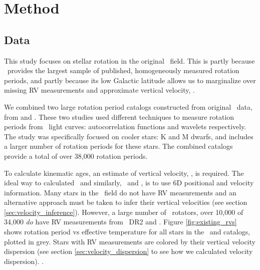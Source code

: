 \section{Method}
\label{sec:method}

\subsection{Data}
\label{sec:data}

This study focuses on stellar rotation in the original \kepler\ field.
This is partly because \kepler\ provides the largest sample of published,
homogeneously measured rotation periods, and partly because its low Galactic
latitude allows us to marginalize over missing RV measurements and approximate
vertical velocity, \vz.

We combined two large rotation period catalogs constructed from original
\kepler\ data, from \citet{mcquillan2014} and \citet{santos2019}.
These two studies used different techniques to measure rotation periods from
\kepler\ light curves: autocorrelation functions and wavelets respectively.
The \citet{santos2019} study was specifically focused on cooler stars: K and M
dwarfs, and includes a larger number of rotation periods for these stars.
The combined catalogs provide a total of over 38,000 rotation periods.

To calculate kinematic ages, an estimate of vertical velocity, \vz, is
required.
The ideal way to calculated \vz\, and similarly, \vx\ and \vy, is to use 6D
positional and velocity information.
Many stars in the \kepler\ field do not have RV measurements and an
alternative approach must be taken to infer their vertical velocities (see
section \ref{sec:velocity_inference}).
However, a large number of \kepler\ rotators, over 10,000 of 34,000 {\it do}
have RV measurements from \gaia\ DR2 and \lamost.
Figure \ref{fig:existing_rvs} shows rotation period vs effective temperature
for all stars in the \mct\ and \citet{santos2019} catalogs, plotted in grey.
Stars with RV measurements are colored by their vertical velocity dispersion
(see section \ref{sec:velocity_dispersion} to see how we calculated velocity
dispersion).
.

